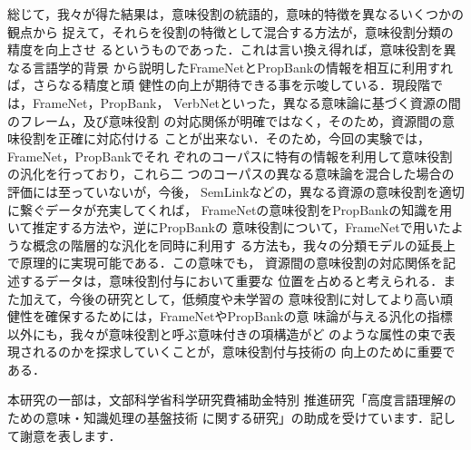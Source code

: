 \documentclass[japanese]{jnlp_1.4}
\begin{document}
総じて，我々が得た結果は，意味役割の統語的，意味的特徴を異なるいくつかの観点から
捉えて，それらを役割の特徴として混合する方法が，意味役割分類の精度を向上させ
るというものであった．これは言い換え得れば，意味役割を異なる言語学的背景
から説明したFrameNetとPropBankの情報を相互に利用すれば，さらなる精度と頑
健性の向上が期待できる事を示唆している．現段階では，FrameNet，PropBank，
VerbNetといった，異なる意味論に基づく資源の間のフレーム，及び意味役割
の対応関係が明確ではなく，そのため，資源間の意味役割を正確に対応付ける
ことが出来ない．そのため，今回の実験では，FrameNet，PropBankでそれ
ぞれのコーパスに特有の情報を利用して意味役割の汎化を行っており，これら二
つのコーパスの異なる意味論を混合した場合の評価には至っていないが，今後，
SemLinkなどの，異なる資源の意味役割を適切に繋ぐデータが充実してくれば，
FrameNetの意味役割をPropBankの知識を用いて推定する方法や，逆にPropBankの
意味役割について，FrameNetで用いたような概念の階層的な汎化を同時に利用す
る方法も，我々の分類モデルの延長上で原理的に実現可能である．この意味でも，
資源間の意味役割の対応関係を記述するデータは，意味役割付与において重要な
位置を占めると考えられる．また加えて，今後の研究として，低頻度や未学習の
意味役割に対してより高い頑健性を確保するためには，FrameNetやPropBankの意
味論が与える汎化の指標以外にも，我々が意味役割と呼ぶ意味付きの項構造がど
のような属性の束で表現されるのかを探求していくことが，意味役割付与技術の
向上のために重要である．


\acknowledgment

本研究の一部は，文部科学省科学研究費補助金特別
推進研究「高度言語理解のための意味・知識処理の基盤技術
に関する研究」の助成を受けています．記して謝意を表します．
\end{document}
